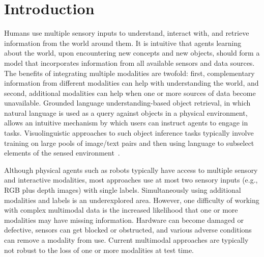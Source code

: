 \documentclass[sigconf,natbib=true,anonymous=true]{acmart}
\begin{document}
% 

\section{Introduction}
\label{intro}
Humans use multiple sensory inputs to understand, interact with, and retrieve information from the world around them. It is intuitive that agents learning about the world, upon encountering new concepts and new objects, should form a model that incorporates information from all available sensors and data sources. The benefits of integrating multiple modalities are twofold: first, complementary information from different modalities can help with understanding the world, and second, additional modalities can help when one or more sources of data become unavailable.
% 
Grounded language understanding-based object retrieval, in which natural language is used as a query against objects in a physical environment, allows an intuitive mechanism by which users can instruct agents to engage in tasks. Visuolinguistic approaches to such object inference tasks typically involve training on large pools of image/text pairs and then using language to subselect elements of the sensed environment~\citep{hong2021gilbert,Zhuge_2021_CVPR_VLP}.

Although physical agents such as robots typically have access to multiple sensory and interactive modalities, most approaches use at most two sensory inputs (e.g., RGB plus depth images) with single labels. Simultaneously using additional modalities and labels is an underexplored area.
However, one difficulty of working with complex multimodal data is the increased likelihood that one or more modalities may have missing information. Hardware can become damaged or defective, sensors can get blocked or obstructed, and various adverse conditions can remove a modality from use. Current multimodal approaches are typically not robust to the loss of one or more modalities at test time.
\end{document}

